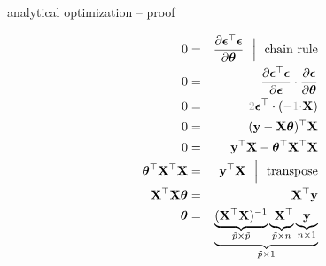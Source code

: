 \documentclass[11pt,compress,t,notes=noshow, xcolor=table]{beamer}
\begin{document}
\begin{vbframe}{analytical optimization -- proof}
\begin{minipage}[t]{0.45\textwidth}
\begin{eqnarray*}
        0 &=& \frac{\partial \bm{\epsilon}^\top \bm{\epsilon} }{\partial 
        \thetab} 
        ~~ \Big \rvert ~~ \text{chain rule} \\
        0 &=& \frac{\partial \bm{\epsilon}^\top \bm{\epsilon}}{\partial 
        \bm{\epsilon}} \cdot \frac{\partial \bm{\epsilon}}{\partial \thetab} \\
        0 &=& \textcolor{black!30}{2}  \bm{\epsilon}^\top \cdot (
        \textcolor{black!30}{-1 \cdot} \Xmat) \\
        0 &=& (\yv - \Xmat \thetab)^\top \Xmat \\
        0 &=& \yv^\top \Xmat - \thetab^\top \Xmat^\top \Xmat \\
        \thetab^\top \Xmat^\top \Xmat &=& \yv^\top \Xmat 
        ~~ \Big \rvert ~~ \text{transpose} \\
        \Xmat^\top \Xmat \thetab &=& \Xmat^\top \yv \\
        \thetab &=& \underbrace{
        \underbrace{(\Xmat^\top \Xmat)^{-1}}_{\tilde p \times \tilde p}
        \underbrace{\phantom{(} \Xmat^\top}_{\tilde p \times n} 
        \underbrace{\yv}_{n \times 1}}_{\tilde p \times 1}
    \end{eqnarray*}
\end{minipage}

\end{vbframe}


\endlecture
\end{document}
